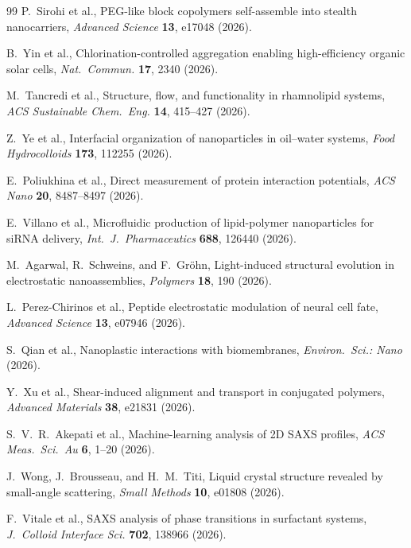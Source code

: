 \documentclass[11pt, a4paper, twocolumn]{article}
\begin{document}
{\begin{thebibliography}{99}
P.~Sirohi et al.,
\newblock PEG-like block copolymers self-assemble into stealth nanocarriers,
\newblock \emph{Advanced Science} \textbf{13}, e17048 (2026).

B.~Yin et al.,
\newblock Chlorination-controlled aggregation enabling high-efficiency organic
solar cells,
\newblock \emph{Nat.\ Commun.} \textbf{17}, 2340 (2026).

M.~Tancredi et al.,
\newblock Structure, flow, and functionality in rhamnolipid systems,
\newblock \emph{ACS Sustainable Chem.\ Eng.} \textbf{14}, 415--427 (2026).

Z.~Ye et al.,
\newblock Interfacial organization of nanoparticles in oil--water systems,
\newblock \emph{Food Hydrocolloids} \textbf{173}, 112255 (2026).

E.~Poliukhina et al.,
\newblock Direct measurement of protein interaction potentials,
\newblock \emph{ACS Nano} \textbf{20}, 8487--8497 (2026).

E.~Villano et al.,
\newblock Microfluidic production of lipid-polymer nanoparticles for siRNA
delivery,
\newblock \emph{Int.\ J.\ Pharmaceutics} \textbf{688}, 126440 (2026).

M.~Agarwal, R.~Schweins, and F.~Gr\"ohn,
\newblock Light-induced structural evolution in electrostatic nanoassemblies,
\newblock \emph{Polymers} \textbf{18}, 190 (2026).

L.~Perez-Chirinos et al.,
\newblock Peptide electrostatic modulation of neural cell fate,
\newblock \emph{Advanced Science} \textbf{13}, e07946 (2026).

S.~Qian et al.,
\newblock Nanoplastic interactions with biomembranes,
\newblock \emph{Environ.\ Sci.: Nano} (2026).

Y.~Xu et al.,
\newblock Shear-induced alignment and transport in conjugated polymers,
\newblock \emph{Advanced Materials} \textbf{38}, e21831 (2026).

S.~V.~R.~Akepati et al.,
\newblock Machine-learning analysis of 2D SAXS profiles,
\newblock \emph{ACS Meas.\ Sci.\ Au} \textbf{6}, 1--20 (2026).

J.~Wong, J.~Brousseau, and H.~M.~Titi,
\newblock Liquid crystal structure revealed by small-angle scattering,
\newblock \emph{Small Methods} \textbf{10}, e01808 (2026).

F.~Vitale et al.,
\newblock SAXS analysis of phase transitions in surfactant systems,
\newblock \emph{J.\ Colloid Interface Sci.} \textbf{702}, 138966 (2026).


\end{thebibliography}}
\end{document}
